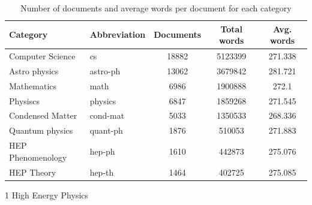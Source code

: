 %
\begin{table}[H]
	\begin{threeparttable}[t]
		\caption{Number of documents and average words per document for each category}%
		\label{tab:arxiv-abs-categories}
		\begin{tabular}{llS[table-format=7]S[table-format=5]S[table-format=3.3]}
			\toprule
			{Category}                             & {Abbreviation} & {Documents} & {Total words} & {Avg. words} \\
			\midrule
			Computer Science                       & cs             & 18882       & 5123399       & 271.338      \\
			Astro physics                          & astro-ph       & 13062       & 3679842       & 281.721      \\
			\addlinespace
			Mathematics                            & math           & 6986        & 1900888       & 272.1        \\
			Physiscs                               & physics        & 6847        & 1859268       & 271.545      \\
			Condensed Matter                       & cond-mat       & 5033        & 1350533       & 268.336      \\
			\addlinespace
			Quantum physics                        & quant-ph       & 1876        & 510053        & 271.883      \\
			HEP \textendash Phenomenology & hep-ph         & 1610        & 442873        & 275.076      \\
			HEP \textendash Theory        & hep-th         & 1464        & 402725        & 275.085      \\
			\bottomrule
		\end{tabular}
		\begin{tablenotes}
			\item[1] High Energy Physics
		\end{tablenotes}
	\end{threeparttable}
\end{table}

